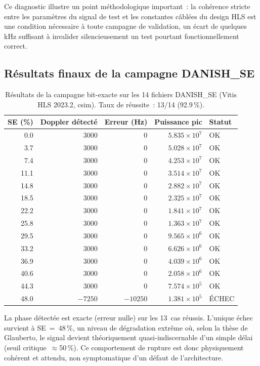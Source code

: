 \documentclass[11pt,a4paper]{article}
\begin{document}
Ce diagnostic illustre un point méthodologique important~: la cohérence stricte entre les paramètres du signal de test et les constantes câblées du design HLS est une condition nécessaire à toute campagne de validation, un écart de quelques kHz suffisant à invalider silencieusement un test pourtant fonctionnellement correct.

\subsection{Résultats finaux de la campagne DANISH\_SE}

\begin{table}[H]
\centering
\renewcommand{\arraystretch}{1.15}
\small
\begin{tabular}{rrrrl}
\toprule
\textbf{SE (\%)} & \textbf{Doppler détecté} & \textbf{Erreur (Hz)} & \textbf{Puissance pic} & \textbf{Statut} \\
\midrule
0.0   & 3000  & 0 & $5.835\times10^{7}$ & OK \\
3.7   & 3000  & 0 & $5.028\times10^{7}$ & OK \\
7.4   & 3000  & 0 & $4.253\times10^{7}$ & OK \\
11.1  & 3000  & 0 & $3.514\times10^{7}$ & OK \\
14.8  & 3000  & 0 & $2.882\times10^{7}$ & OK \\
18.5  & 3000  & 0 & $2.325\times10^{7}$ & OK \\
22.2  & 3000  & 0 & $1.841\times10^{7}$ & OK \\
25.8  & 3000  & 0 & $1.363\times10^{7}$ & OK \\
29.5  & 3000  & 0 & $9.565\times10^{6}$ & OK \\
33.2  & 3000  & 0 & $6.626\times10^{6}$ & OK \\
36.9  & 3000  & 0 & $4.039\times10^{6}$ & OK \\
40.6  & 3000  & 0 & $2.058\times10^{6}$ & OK \\
44.3  & 3000  & 0 & $7.574\times10^{5}$ & OK \\
48.0  & $-7250$ & $-10250$ & $1.381\times10^{5}$ & ÉCHEC \\
\bottomrule
\end{tabular}
\caption{Résultats de la campagne bit-exacte sur les 14 fichiers DANISH\_SE (Vitis HLS 2023.2, csim). Taux de réussite~: 13/14 (92.9\,\%).}
\end{table}

La phase détectée est exacte (erreur nulle) sur les 13~cas réussis. L'unique échec survient à SE~=~48\,\%, un niveau de dégradation extrême où, selon la thèse de Glauberto, le signal devient théoriquement quasi-indiscernable d'un simple délai (seuil critique~$\approx$50\,\%). Ce comportement de rupture est donc physiquement cohérent et attendu, non symptomatique d'un défaut de l'architecture.
\end{document}
